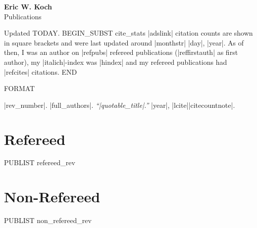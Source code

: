 \documentclass[letterpaper,11pt]{article}
\newcommand{\myname}{Eric W. Koch}
\newcommand{\mysite}{e-koch.github.io}
\newenvironment{publist}{
  \begingroup
  \raggedright
  \begin{description}[leftmargin=4ex,style=sameline]
}{
  \end{description}
  \endgroup
}
\begin{document}
\pagestyle{fancy}
\lhead{} \chead{} \rhead{} \renewcommand{\headrule}{\relax}
\cfoot{\thepage/\pageref*{LastPage}}
\rfoot{\textsc{\myname}}

\begin{center}
\textbf{\Large \myname} \\
{\large Publications}
\end{center}



\noindent Updated %
TODAY.
BEGIN_SUBST cite_stats
|adslink| citation counts are shown in square brackets and were last updated
around |monthstr| |day|, |year|. As of then, I was an author on |refpubs|
refereed publications (|reffirstauth| as first author), my |italich|-index was
|hindex| and my refereed publications had |refcites| citations.
END

FORMAT \item[|rev_number|.] |full_authors|. \textit{``|quotable_title|.''} |year|, |lcite||citecountnote|.



\section*{Refereed}

\begin{publist}
PUBLIST refereed_rev
\end{publist}



\section*{Non-Refereed}

\begin{publist}
PUBLIST non_refereed_rev
\end{publist}
\end{document}
